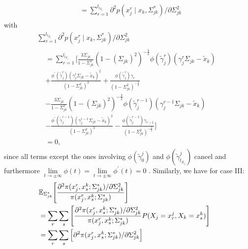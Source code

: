 \begin{condition}
\begin{condition}
\begin{multline*}
\begin{aligned}
                &= \sum_{r=1}^{l_{l_{X_j}}} \partial^2 p(x_j^{r} \mid x_{k}, \Sigma_{jk}^*)/\partial \Sigma_{jk}^{2}
                \end{aligned}
        \end{multline*}
        with 
        \begin{multline*}
                \sum_{r=1}^{l_{l_{X_j}}} \partial^2 p(x_j^{r} \mid x_{k}, \Sigma_{jk}^*)/\partial \Sigma_{jk}^{2}\\
                \begin{aligned}
                &=\sum_{r=1}^{l_{l_{X_j}}} \Bigg[ \frac{3\Sigma_{jk}}{1-\Sigma_{jk}^2} (1-(\Sigma_{jk})^2)^{-\frac{3}{2}} \phi({\tilde{\gamma}}_j^{r})({\gamma}_j^r\Sigma_{jk} - {\tilde{x}}_{k}) \\
                &+ \frac{\phi^\prime({\tilde{\gamma}}_j^{r})({\gamma}_j^r\Sigma_{jk} - {\tilde{x}}_{k})^2}{(1-\Sigma_{jk}^2)^3} + \frac{\phi({\tilde{\gamma}}_j^{r}){\gamma}_{r}}{(1-\Sigma_{jk}^2)^{-\frac{3}{2}}} \\
                &- \frac{3\Sigma_{jk}}{1-\Sigma_{jk}^2} (1-(\Sigma_{jk})^2)^{-\frac{3}{2}} \phi({\tilde{\gamma}}_j^{r-1})({\gamma}_j^{r-1}\Sigma_{jk} - {\tilde{x}}_{k}) \\
                &- \frac{\phi^\prime({\tilde{\gamma}}_j^{r-1})({\gamma}_j^{r-1}\Sigma_{jk} - {\tilde{x}}_{k})^2}{(1-\Sigma_{jk}^2)^3} - \frac{\phi({\tilde{\gamma}}_j^{r-1}){\gamma}_{r-1}}{(1-\Sigma_{jk}^2)^{-\frac{3}{2}}}\Bigg] \\
                &= 0,
                \end{aligned}
        \end{multline*}
        since all terms except the ones involving $\phi({\tilde{\gamma}}^j_{0})$ and $\phi({\tilde{\gamma}}^j_{l_{X_j}})$ cancel and furthermore $ \lim\limits_{t \to \pm \infty} \phi(t) = \lim\limits_{t \to \pm \infty} \phi^\prime(t) = 0$ . Similarly, we have for case III:
        \begin{equation*}
            \begin{split}
                \lefteqn{\mathbb{E}_{\Sigma_{jk}^*}\Bigg[\frac{\partial^2 \pi(x_j^{r},x^k_{s}; \Sigma_{jk}^*)/\partial \Sigma_{jk}^{2}}{\pi(x_j^{r},x^k_{s}; \Sigma_{jk}^*)}\Bigg]} \\
                &= \sum_r \sum_s \Bigg[\frac{\partial^2 \pi(x_j^{r},x^k_{s}; \Sigma_{jk}^*)/\partial \Sigma_{jk}^{2}}{\pi(x_j^{r},x^k_{s}; \Sigma_{jk}^*)} P(X_j = x_r^j, X_k = x_s^k)\Bigg] \\
                &= \sum_r\sum_s \Big[\partial^2 \pi(x_j^{r},x^k_{s}; \Sigma_{jk}^*)/\partial \Sigma_{jk}^{2}\Big] \\

\end{split}
\end{equation*}
\end{condition}
\end{condition}
